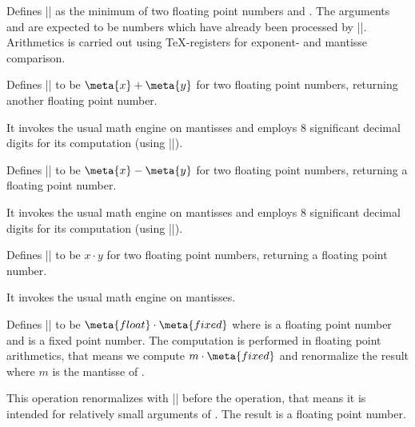 \begin{command}{}
	Defines |\pgfmathresult| as the minimum of two floating point numbers  and . The arguments  and  are expected to be numbers which have already been processed by |\pgfmathfloatparsenumber|. Arithmetics is carried out using \TeX-registers for exponent- and mantisse comparison.
\end{command}


\begin{command}{}
	Defines |\pgfmathresult| to be $\meta{x} + \meta{y}$ for two floating point numbers, returning another floating point number.

	It invokes the usual math engine on mantisses and employs 8 significant decimal digits for its computation (using |\pgfmathfloattoextentedprecision|).
\end{command}

\begin{command}{}
	Defines |\pgfmathresult| to be $\meta{x} - \meta{y}$ for two floating point numbers, returning a floating point number.

	It invokes the usual math engine on mantisses and employs 8 significant decimal digits for its computation (using |\pgfmathfloattoextentedprecision|).
\end{command}

\begin{command}{}
	Defines |\pgfmathresult| to be $x \cdot y$ for two floating point numbers, returning a floating point number.
	
	It invokes the usual math engine on mantisses.
\end{command}
\begin{command}{\pgfmathfloatmultiplyfixed{}}
	Defines |\pgfmathresult| to be $\meta{float} \cdot \meta{fixed}$ where  is a floating point number and  is a fixed point number. The computation is performed in floating point arithmetics, that means we compute $m \cdot \meta{fixed}$ and renormalize the result where $m$ is the mantisse of .

	This operation renormalizes  with |\pgfmathfloattoextentedprecision| before the operation, that means it is intended for relatively small arguments of . The result is a floating point number.
\end{command}

